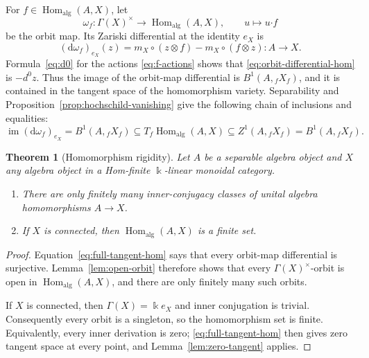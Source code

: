\documentclass[11pt]{amsart}
\newtheorem{theorem}{Theorem}[section]
\theoremstyle{definition}
\theoremstyle{remark}
\newcommand{\kk}{\Bbbk}
\DeclareMathOperator{\Hom}{Hom}
\begin{document}
For $f\in\Hom_{\mathrm{alg}}(A,X)$, let
\[
  \omega_f:\Gamma(X)^\times\longrightarrow
  \Hom_{\mathrm{alg}}(A,X),
  \qquad u\longmapsto u\boldsymbol\cdot f
\]
be the orbit map.  Its Zariski differential at the identity $e_X$ is
\begin{equation}\label{eq:orbit-differential-hom}
  (\mathrm d\omega_f)_{e_X}(z)
  =m_X\circ(z\otimes f)-m_X\circ(f\otimes z):A\longrightarrow X.
\end{equation}
Formula~\eqref{eq:d0} for the actions \eqref{eq:f-actions} shows that
\eqref{eq:orbit-differential-hom} is $-d^0z$.  Thus the image of the
orbit-map differential is $B^1(A,{}_fX_f)$, and it is contained in the
tangent space of the homomorphism variety.  Separability and
Proposition~\ref{prop:hochschild-vanishing} give the
following chain of inclusions and equalities:
\begin{equation}\label{eq:full-tangent-hom}
  \operatorname{im}(\mathrm d\omega_f)_{e_X}
  =B^1(A,{}_fX_f)
  \subseteq T_f\Hom_{\mathrm{alg}}(A,X)
  \subseteq Z^1(A,{}_fX_f)
  =B^1(A,{}_fX_f).
\end{equation}

\begin{theorem}[Homomorphism rigidity]\label{thm:homomorphisms}
Let $A$ be a separable algebra object and $X$ any algebra object in a
Hom-finite $\kk$-linear monoidal category.
\begin{enumerate}[label=\textup{(\roman*)}]
  \item There are only finitely many inner-conjugacy classes of unital
  algebra homomorphisms $A\to X$.
  \item If $X$ is connected, then $\Hom_{\mathrm{alg}}(A,X)$ is a finite
  set.
\end{enumerate}
\end{theorem}

\begin{proof}
Equation~\eqref{eq:full-tangent-hom} says that every orbit-map differential
is surjective.  Lemma~\ref{lem:open-orbit} therefore shows that every
$\Gamma(X)^\times$-orbit is open
in $\Hom_{\mathrm{alg}}(A,X)$, and there are only finitely many such orbits.

If $X$ is connected, then $\Gamma(X)=\kk e_X$ and inner conjugation is
trivial.  Consequently every orbit is a singleton, so the homomorphism set
is finite.  Equivalently, every inner derivation is zero;
\eqref{eq:full-tangent-hom} then gives zero tangent space at every point, and
Lemma~\ref{lem:zero-tangent} applies.
\end{proof}
\end{document}
